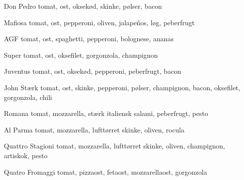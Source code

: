 \begin{multicols}{2}
\begin{enumdescription}
  \item[Don Pedro] tomat, ost, oksekød, skinke, pølser, bacon
  \item[Mafiosa] tomat, ost, pepperoni, oliven, jalapeños, løg,
    peberfrugt
  \item[AGF] tomat, ost, spaghetti, pepperoni, bolognese, ananas
  \item[Super] tomat, ost, oksefilet, gorgonzola, champignon
  \item[Juventus] tomat, ost, oksekød, pepperoni, peberfrugt, bacon
  \item[John Stærk] tomat, ost, skinke, pepperoni, pølser, champignon,
    bacon, oksefilet, gorgonzola, chili
  \item[Romana] tomat, mozzarella, stærk italiensk salami, peberfrugt,
    pesto
  \item[Al Parma] tomat, mozzarella, lufttørret skinke, oliven, rocula
  \item[Quattro Stagioni] tomat, mozzarella, lufttørret skinke,
    oliven, champignon, artiskok, pesto
  \item[Quatro Fromaggi] tomat, pizzaost, fetaost, mozzarellaost,
    gorgonzola
  \end{enumdescription}
\end{multicols}



